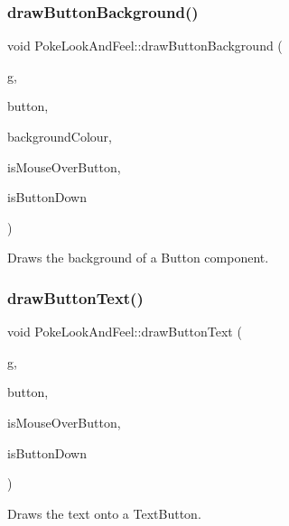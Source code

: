 \subsubsection{\texorpdfstring{draw\+Button\+Background()}{drawButtonBackground()}}
{\footnotesize\ttfamily void Poke\+Look\+And\+Feel\+::draw\+Button\+Background (\begin{DoxyParamCaption}\item[{Graphics \&}]{g,  }\item[{Button \&}]{button,  }\item[{const Colour \&}]{background\+Colour,  }\item[{bool}]{is\+Mouse\+Over\+Button,  }\item[{bool}]{is\+Button\+Down }\end{DoxyParamCaption})\hspace{0.3cm}{\ttfamily [override]}}

Draws the background of a Button component. \mbox{\label{classPokeLookAndFeel_a11362adcae119885bac7d5b4c1a14ce3}} 
\subsubsection{\texorpdfstring{draw\+Button\+Text()}{drawButtonText()}}
{\footnotesize\ttfamily void Poke\+Look\+And\+Feel\+::draw\+Button\+Text (\begin{DoxyParamCaption}\item[{Graphics \&}]{g,  }\item[{Text\+Button \&}]{button,  }\item[{bool}]{is\+Mouse\+Over\+Button,  }\item[{bool}]{is\+Button\+Down }\end{DoxyParamCaption})\hspace{0.3cm}{\ttfamily [override]}}

Draws the text onto a Text\+Button. \mbox{\label{classPokeLookAndFeel_ac047234a631915cde1ee0a214e397c6a}} 

